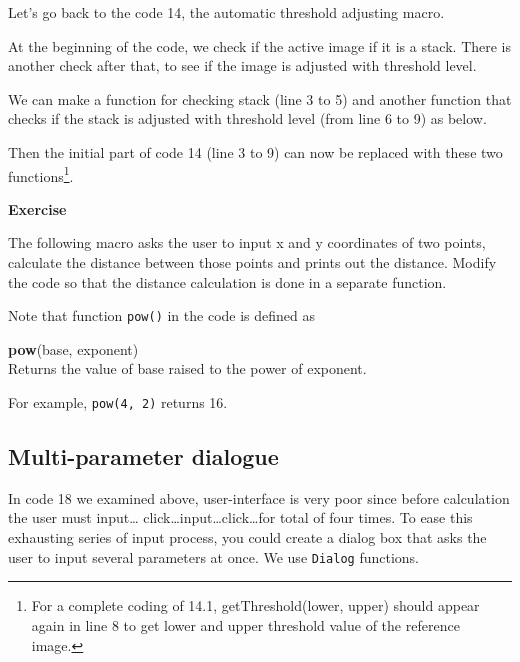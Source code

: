 \documentclass[11pt,a4paper,oneside]{report}
\newenvironment{indentexercise}[1]%
{{\setlength{\leftmargin}{2em}}%
\textbf{Exercise \thesubsection-#1}%
\begin{list}{}%
	\item%
}
{\end{list}}
\newenvironment{indentCom}%
{\begin{list}{}%
         {\setlength{\leftmargin}{1em}}%
         \item[]%
}
{\end{list}}
\newcommand{\ilcom}[1]{\texttt{\small#1}}
\begin{document}
Let's go back to the code 14, the automatic threshold adjusting macro. 

At the beginning of the code, we check if the active image if it is a stack. 
There is another check after that, to see if the image is adjusted with threshold level.



We can make a function for checking stack (line 3 to 5) and another function that checks 
if the stack is adjusted with threshold level (from line 6 to 9) as below.



Then the initial part of code 14 (line 3 to 9) can now be replaced with 
these two functions\footnote{For a complete coding of 14.1, 
getThreshold(lower, upper) should appear again in line 8 to get lower and upper threshold value 
of the reference image.}. 



\begin{indentexercise}{1}
The following macro asks the user to input x and y coordinates of two points, 
calculate the distance between those points and prints out the distance. 
Modify the code so that the distance calculation is done in a separate function. 



Note that function \ilcom{pow()} in the code is defined as
\begin{indentCom}
\textbf{pow}(base, exponent)\\
Returns the value of base raised to the power of exponent. 
\end{indentCom}
For example, \ilcom{pow(4, 2)} returns 16.
\end{indentexercise}

\subsection{Multi-parameter dialogue}
In code 18 we examined above, 
user-interface is very poor since before calculation the user must input\ldots 
click\ldots input\ldots click\ldots for total of four times. 
To ease this exhausting series of input process, 
you could create a dialog box that asks the user to input several parameters at once. 
We use \ilcom{Dialog} functions. 


\end{document}
